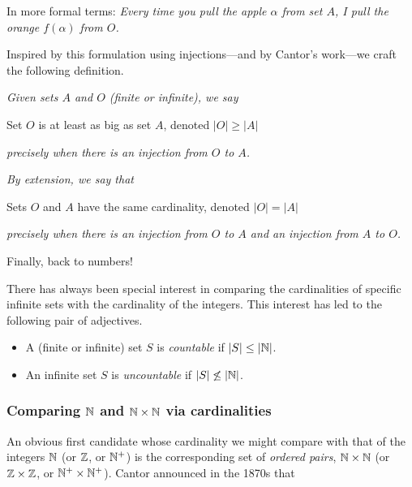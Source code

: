 \noindent
In more formal terms: {\em Every time you pull the apple $\alpha$ from set $A$, I pull the orange $f(\alpha)$ from $O$.}

\medskip

Inspired by this formulation using injections---and by Cantor's work---we craft the following definition.

\bigskip

\noindent
{\em Given sets $A$ and $O$ (finite or infinite), we say}

Set $O$ is at least as big as set $A$, denoted $|O| \geq |A|$

\noindent
{\em precisely when there is an injection from $O$ to $A$.}

\medskip

\noindent
{\em By extension, we say that}

Sets $O$ and $A$ have the same cardinality, denoted $|O| = |A|$

\noindent
{\em precisely when there is an injection from $O$ to $A$ {\em and} an injection from $A$ to $O$.}

\bigskip

Finally, back to numbers!

\smallskip

There has always been special interest in comparing the cardinalities of specific infinite sets with the cardinality of the integers.  This interest has led to the following pair of adjectives.

  
 
\begin{itemize}
\item
A (finite or infinite) set $S$ is {\it countable} if $|S| \leq |\mathbb{N}|$.

\medskip\item
An infinite set $S$ is {\it uncountable} if $|S| \not\leq |\mathbb{N}|$.
\end{itemize}

\subsubsection{Comparing $\mathbb{N}$ and $\mathbb{N} \times \mathbb{N}$ via cardinalities}
\label{sec:compare-NxN-N-via-card}

An obvious first candidate whose cardinality we might compare with that of the integers $\mathbb{N}$ (or $\mathbb{Z}$, or $\mathbb{N}^+$) is the corresponding set of {\em ordered pairs}, $\mathbb{N} \times \mathbb{N}$ (or $\mathbb{Z} \times \mathbb{Z}$, or $\mathbb{N}^+ \times \mathbb{N}^+$).  Cantor announced in the 1870s that

